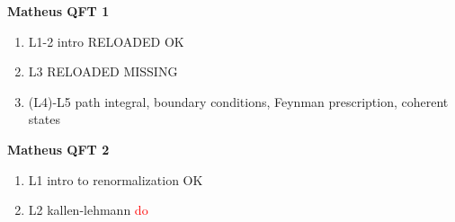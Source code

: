 \noindent
\textbf{Matheus QFT 1}
\begin{enumerate}
    \item L1-2 intro RELOADED {\color{blue} OK}
    \item L3 RELOADED {\color{red} MISSING}
    \item (L4)-L5 path integral, boundary conditions, Feynman prescription, coherent states
\end{enumerate}


\noindent
\textbf{Matheus QFT 2}
\begin{enumerate}
    \item L1 intro to renormalization OK
    \item L2 kallen-lehmann {\textcolor{red}{do}}
\end{enumerate}